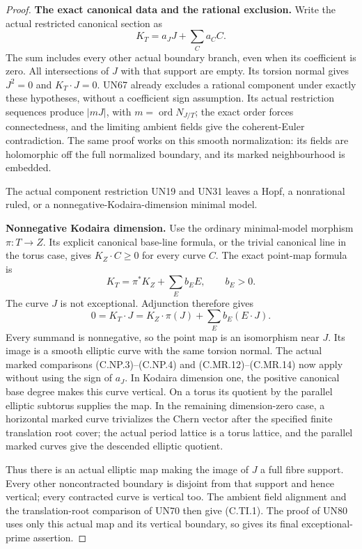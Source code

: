\begin{proof}
\par\medskip\noindent\textbf{The exact canonical data and the rational exclusion.}
Write the actual restricted canonical section as
\[
              K_T=a_JJ+\sum_C a_CC.
 \tag{C.TI.5}
\]
The sum includes every other actual boundary branch,
even when its coefficient is zero. All intersections
of \(J\) with that support are empty. Its torsion
normal gives \(J^2=0\) and \(K_T\cdot J=0\).
UN67 already excludes a rational component under
exactly these hypotheses, without a coefficient
sign assumption. Its actual restriction sequences
produce \(|mJ|\), with
\(m=\operatorname{ord}N_{J/T}\); the exact order
forces connectedness, and the limiting ambient
fields give the coherent-Euler contradiction.
The same proof works on this smooth normalization:
its fields are holomorphic off the full normalized
boundary, and its marked neighbourhood is embedded.

The actual component restriction UN19 and UN31
leaves a Hopf, a nonrational ruled, or a
nonnegative-Kodaira-dimension minimal model.

\par\medskip\noindent\textbf{Nonnegative Kodaira dimension.}
Use the ordinary minimal-model morphism
\(\pi:T\to Z\). Its explicit canonical base-line
formula, or the trivial canonical line in the
torus case, gives \(K_Z\cdot C\ge0\) for every
curve \(C\). The exact point-map formula is
\[
 K_T=\pi^*K_Z+\sum_E b_EE,\qquad b_E>0.
 \tag{C.TI.6}
\]
The curve \(J\) is not exceptional. Adjunction
therefore gives
\[
 0=K_T\cdot J
   =K_Z\cdot\pi(J)+\sum_E b_E(E\cdot J).
 \tag{C.TI.7}
\]
Every summand is nonnegative, so the point map is
an isomorphism near \(J\). Its image is a smooth
elliptic curve with the same torsion normal.
The actual marked comparisons (C.NP.3)--(C.NP.4)
and (C.MR.12)--(C.MR.14) now apply without using
the sign of \(a_J\). In Kodaira dimension one,
the positive canonical base degree makes this
curve vertical. On a torus its quotient by the
parallel elliptic subtorus supplies the map.
In the remaining dimension-zero case, a
horizontal marked curve trivializes the Chern
vector after the specified finite translation
root cover; the actual period lattice is a
torus lattice, and the parallel marked curves
give the descended elliptic quotient.

Thus there is an actual elliptic map making
the image of \(J\) a full fibre support.
Every other noncontracted boundary is disjoint
from that support and hence vertical; every
contracted curve is vertical too. The ambient
field alignment and the translation-root
comparison of UN70 then give (C.TI.1).
The proof of UN80 uses only this actual map
and its vertical boundary, so gives its final
exceptional-prime assertion.


\end{proof}
